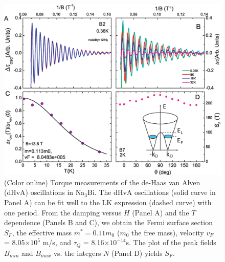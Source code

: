 \begin{figure}[!htbp]
  \begin{center}
\includegraphics[width=1\linewidth]{ch-na3bi/figures/FigTorqueA}
\caption{\label{figtorque} (Color online)
Torque measurements of the de-Haas van Alven (dHvA) oscillations in Na$_3$Bi. The dHvA oscillations (solid curve in Panel A) can be fit well to the LK expression (dashed curve) with one period. From the damping versus $H$ (Panel A) and the $T$ dependence (Panels B and C), we obtain the Fermi surface section $S_F$, the effective mass $m^* = 0.11 m_0$ ($m_0$ the free mass), velocity $v_F$ = 8.05$\times 10^5$ m/s, and $\tau_Q$ = 8.16$\times 10^{-14}$s. The plot of the peak fields $B_{min}$ and $B_{max}$ vs. the integers $N$ (Panel D) yields $S_F$. 
}
  \end{center}
\end{figure}

